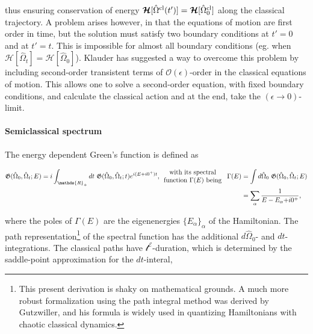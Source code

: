 \documentclass{homework}
\begin{document}
thus ensuring conservation of energy $\bm{\mathcal{H}} [\hat{\Omega}^{\textnormal{cl}} (t')] = \bm{\mathcal{H}} [\hat{\Omega}^{\textnormal{cl}}_0]$ along the classical trajectory. A problem arises however, in that the equations of motion are first order in time, but the solution must satisfy two boundary conditions at $t' = 0$ and at $t' = t$. This is impossible for almost all boundary conditions (eg. when $\bm{\mathcal{H}} [\hat{\Omega}_{t}] = \bm{\mathcal{H}} [\hat{\Omega}_0]$). Klauder has suggested a way to overcome this problem by including second-order transistent terms of $\mathcal{O}(\epsilon)$-order in the classical equations of motion. This allows one to solve a second-order equation, with fixed boundary conditions, and calculate the classical action and at the end, take the $(\epsilon \rightarrow 0)$-limit. \\

\paragraph{Semiclassical spectrum}

The energy dependent Green's function is defined as 

\begin{equation*}\begin{split}
    \mathfrak{G}(\hat{\Omega}_0, \hat{\Omega}_t; E) = i \int_{\mathds{R}_+} dt \blanky \mathfrak{G}(\hat{\Omega}_0, \hat{\Omega}_t; t) e^{i(E+i0^+)t}, \begin{array}{cc}
         \textnormal{with its spectral } \\
         \textnormal{function $\Gamma(E)$ being } 
         \end{array}
        \Gamma(E) &= \int d\hat{\Omega}_0 \blanky \mathfrak{G}(\hat{\Omega}_0, \hat{\Omega}_t; E) \\
        &= \sum_{\alpha} \frac{1}{E-E_{\alpha}{ + i0^+}},
    \end{split}
\end{equation*}

where the poles of $\Gamma(E)$ are the eigenenergies $\{E_{\alpha}\}_{\alpha}$ of the Hamiltonian. The path  representation\footnote{This present derivation is shaky on mathematical grounds. A much more robust formalization using the path integral method was derived by Gutzwiller, and his formula is widely used in quantizing Hamiltonians with chaotic classical dynamics.} of the spectral function has the additional $d\hat{\Omega}_0$- and $dt$-integrations. The classical paths have $\mathcal{t^E}$-duration, which is determined by the saddle-point approximation for the $dt$-interal, 
\end{document}
